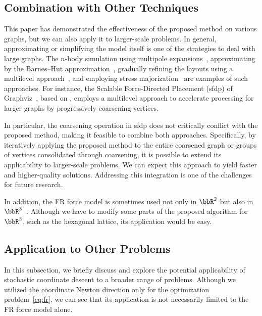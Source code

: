 \documentclass[dvipdfmx,10pt,journal,compsoc]{IEEEtran}
\begin{document}
\subsection{Combination with Other Techniques}\label{sec:combination}

This paper has demonstrated the effectiveness of the proposed method on various graphs, but we can also apply it to larger-scale problems.
In general, approximating or simplifying the model itself is one of the strategies to deal with large graphs.
The $n$-body simulation using multipole expansions~\cite{greengardFastAlgorithmParticle1987}, approximating by the Barnes--Hut approximation~\cite{barnesHierarchicalLogForcecalculation1986}, gradually refining the layouts using a multilevel approach~\cite{Hu2006EfficientHF}, and employing stress majorization~\cite{gansnerGraphDrawingStress2005} are examples of such approaches.
For instance, the Scalable Force-Directed Placement (sfdp) of Graphviz~\cite{ellsonGraphvizOpenSource2002}, based on \cite{Hu2006EfficientHF}, employs a multilevel approach to accelerate processing for larger graphs by progressively coarsening vertices.

In particular, the coarsening operation in sfdp does not critically conflict with the proposed method, making it feasible to combine both approaches.
Specifically, by iteratively applying the proposed method to the entire coarsened graph or groups of vertices consolidated through coarsening, it is possible to extend its applicability to larger-scale problems.
We can expect this approach to yield faster and higher-quality solutions.
Addressing this integration is one of the challenges for future research.

In addition, the FR force model is sometimes used not only in $\bbR^2$ but also in $\bbR^3$~\cite{14738716211060306}. Although we have to modify some parts of the proposed algorithm for $\bbR^3$, such as the hexagonal lattice, its application would be easy.

\subsection{Application to Other Problems}\label{ssec:application}

In this subsection, we briefly discuss and explore the potential applicability of stochastic coordinate descent to a broader range of problems.
Although we utilized the coordinate Newton direction only for the optimization problem~\eqref{eq:fr}, we can see that its application is not necessarily limited to the FR force model alone.
\end{document}
